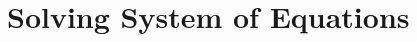 \documentclass[../../Assignments.tex]{subfiles}
\begin{document}
\chapter{Solving System of Equations}



\end{document}
